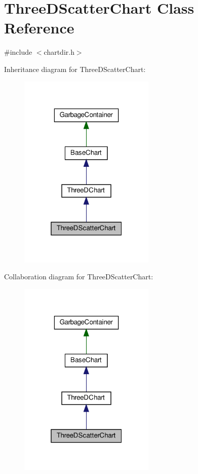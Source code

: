 \hypertarget{class_three_d_scatter_chart}{}\section{Three\+D\+Scatter\+Chart Class Reference}
\label{class_three_d_scatter_chart}


{\ttfamily \#include $<$chartdir.\+h$>$}



Inheritance diagram for Three\+D\+Scatter\+Chart\+:
\nopagebreak
\begin{figure}[H]
\begin{center}
\leavevmode
\includegraphics[width=184pt]{class_three_d_scatter_chart__inherit__graph}
\end{center}
\end{figure}


Collaboration diagram for Three\+D\+Scatter\+Chart\+:
\nopagebreak
\begin{figure}[H]
\begin{center}
\leavevmode
\includegraphics[width=184pt]{class_three_d_scatter_chart__coll__graph}
\end{center}
\end{figure}
